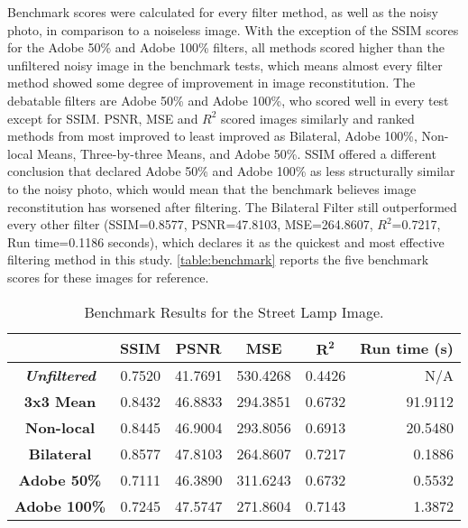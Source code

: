 \documentclass{ncjms}
\begin{document}
Benchmark scores were calculated for every filter method, as well as the noisy photo, in comparison to a noiseless image. With the exception of the SSIM scores for the Adobe 50\% and Adobe 100\% filters, all methods scored higher than the unfiltered noisy image in the benchmark tests, which means almost every filter method showed some degree of improvement in image reconstitution. The debatable filters are Adobe 50\% and Adobe 100\%, who scored well in every test except for SSIM. PSNR, MSE and $R^2$ scored images similarly and ranked methods from most improved to least improved as Bilateral, Adobe 100\%, Non-local Means, Three-by-three Means, and Adobe 50\%. SSIM offered a different conclusion that declared Adobe 50\% and Adobe 100\% as less structurally similar to the noisy photo, which would mean that the benchmark believes image reconstitution has worsened after filtering. The Bilateral Filter still outperformed every other filter (SSIM=0.8577, PSNR=47.8103, MSE=264.8607, $R^2$=0.7217, Run time=0.1186 seconds), which declares it as the quickest and most effective filtering method in this study. \autoref{table:benchmark} reports the five benchmark scores for these images for reference. 

\begin{table}[ht]
\caption{Benchmark Results for the Street Lamp Image.} %
\centering %
\begin{tabular}{|c|r|r|r|r|r|} %
\hline %
 & \multicolumn{1}{c|}{\textbf{SSIM}} & \multicolumn{1}{c|}{\textbf{PSNR}} & \multicolumn{1}{c|}{\textbf{MSE}} & \multicolumn{1}{c|}{$\mathbf{R^2}$} & \multicolumn{1}{c|}{\textbf{Run time (s)}} \\ [0.5ex] %
\hline %
\textbf{\textit{Unfiltered}} & 0.7520 & 41.7691 & 530.4268 & 0.4426 & N/A  \\
\textbf{3x3 Mean} & 0.8432 & 46.8833 & 294.3851 & 0.6732 & 91.9112 \\ 
\textbf{Non-local} & 0.8445 & 46.9004 & 293.8056 & 0.6913 & 20.5480 \\
\textbf{Bilateral} & 0.8577 & 47.8103 & 264.8607 & 0.7217 & 0.1886 \\
\textbf{Adobe 50\%} & 0.7111 & 46.3890 & 311.6243 & 0.6732 & 0.5532 \\
\textbf{Adobe 100\%} & 0.7245 & 47.5747 & 271.8604 & 0.7143 & 1.3872 \\ [1ex] %
\hline %
\end{tabular}
\label{table:benchmark} %
\end{table}
\end{document}
